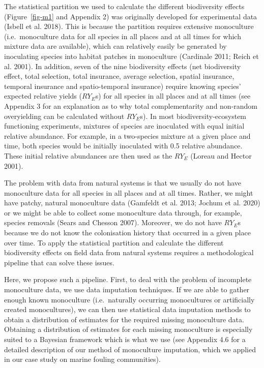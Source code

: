\documentclass[
  letterpaper,
  DIV=11,
  numbers=noendperiod]{scrartcl}
\begin{document}
The statistical partition we used to calculate the different
biodiversity effects (Figure~\ref{fig-m1} and Appendix 2) was originally
developed for experimental data (Isbell et al. 2018). This is because
the partition requires extensive monoculture (i.e.~monoculture data for
all species in all places and at all times for which mixture data are
available), which can relatively easily be generated by inoculating
species into habitat patches in monoculture (Cardinale 2011; Reich et
al. 2001). In addition, seven of the nine biodiversity effects (net
biodiversity effect, total selection, total insurance, average
selection, spatial insurance, temporal insurance and spatio-temporal
insurance) require knowing species' expected relative yields
(\(RY_{E}\)s) for all species in all places and at all times (see
Appendix 3 for an explanation as to why total complementarity and
non-random overyielding can be calculated without \(RY_{E}\)s). In most
biodiversity-ecosystem functioning experiments, mixtures of species are
inoculated with equal initial relative abundance. For example, in a
two-species mixture at a given place and time, both species would be
initially inoculated with 0.5 relative abundance. These initial relative
abundances are then used as the \(RY_{E}\) (Loreau and Hector 2001).

The problem with data from natural systems is that we usually do not
have monoculture data for all species in all places and at all times.
Rather, we might have patchy, natural monoculture data (Gamfeldt et al.
2013; Jochum et al. 2020) or we might be able to collect some
monoculture data through, for example, species removals (Sears and
Chesson 2007). Moreover, we do not have \(RY_{E}\)s because we do not
know the colonisation history that occurred in a given place over time.
To apply the statistical partition and calculate the different
biodiversity effects on field data from natural systems requires a
methodological pipeline that can solve these issues.

Here, we propose such a pipeline. First, to deal with the problem of
incomplete monoculture data, we use data imputation techniques. If we
are able to gather enough known monoculture (i.e.~naturally occurring
monocultures or artificially created monocultures), we can then use
statistical data imputation methods to obtain a distribution of
estimates for the required missing monoculture data. Obtaining a
distribution of estimates for each missing monoculture is especially
suited to a Bayesian framework which is what we use (see Appendix 4.6
for a detailed description of our method of monoculture imputation,
which we applied in our case study on marine fouling communities).
\end{document}
